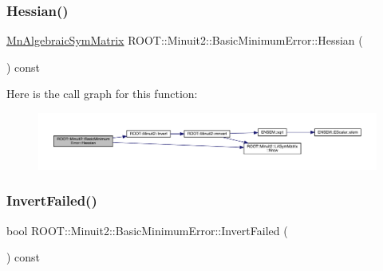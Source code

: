 \mbox{\label{classROOT_1_1Minuit2_1_1BasicMinimumError_a9d247706dc8b8a83d7adf2912eabe91f}} 
\subsubsection{\texorpdfstring{Hessian()}{Hessian()}\hspace{0.1cm}{\footnotesize\ttfamily [3/3]}}
{\footnotesize\ttfamily \mbox{\hyperlink{namespaceROOT_1_1Minuit2_a9e74ad97f5537a2e80e52b04d98ecc6e}{Mn\+Algebraic\+Sym\+Matrix}} R\+O\+O\+T\+::\+Minuit2\+::\+Basic\+Minimum\+Error\+::\+Hessian (\begin{DoxyParamCaption}{ }\end{DoxyParamCaption}) const}

Here is the call graph for this function\+:
\nopagebreak
\begin{figure}[H]
\begin{center}
\leavevmode
\includegraphics[width=350pt]{d9/ddd/classROOT_1_1Minuit2_1_1BasicMinimumError_a9d247706dc8b8a83d7adf2912eabe91f_cgraph}
\end{center}
\end{figure}
\mbox{\label{classROOT_1_1Minuit2_1_1BasicMinimumError_ac93ba151cf6ea3bbc330dd715764de2f}} 
\subsubsection{\texorpdfstring{InvertFailed()}{InvertFailed()}\hspace{0.1cm}{\footnotesize\ttfamily [1/3]}}
{\footnotesize\ttfamily bool R\+O\+O\+T\+::\+Minuit2\+::\+Basic\+Minimum\+Error\+::\+Invert\+Failed (\begin{DoxyParamCaption}{ }\end{DoxyParamCaption}) const\hspace{0.3cm}{\ttfamily [inline]}}


